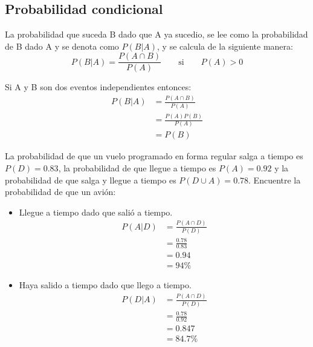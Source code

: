 \subsection{Probabilidad condicional}
\begin{definicion}
    La probabilidad que suceda B dado que A ya sucedio, se lee como la probabilidad de B dado A y se denota como $P(B|A)$, y se calcula de la siguiente manera:
    \begin{equation*}
        P(B|A)= \frac{P(A\cap B)}{P(A)} \qquad \text{si} \qquad P(A)>0
    \end{equation*}
\end{definicion}
Si A y B son dos eventos independientes entonces:
\begin{align*}
    P(B|A) & = \frac{P(A\cap B)}{P(A)} \\
           & = \frac{P(A)P(B)}{P(A)}   \\
           & = P(B)
\end{align*}
\begin{ejemplo}
    La probabilidad de que un vuelo programado en forma regular salga a tiempo es $P(D)=0.83$, la probabilidad de que llegue a tiempo es $P(A)=0.92$ y la probabilidad de que salga y llegue a tiempo es $P(D\cup A)=0.78$. Encuentre la probabilidad de que un avión:
    \begin{itemize}
        \item Llegue a tiempo dado que salió a tiempo.
              \begin{align*}
                  P(A|D) & = \frac{P(A\cap D)}{P(D)} \\
                         & = \frac{0.78}{0.83}       \\
                         & = 0.94                    \\
                         & = 94\%
              \end{align*}
        \item Haya salido a tiempo dado que llego a tiempo.
              \begin{align*}
                  P(D|A) & = \frac{P(A\cap D)}{P(D)} \\
                         & = \frac{0.78}{0.92}       \\
                         & = 0.847                   \\
                         & = 84.7\%
              \end{align*}
    \end{itemize}
\end{ejemplo}
